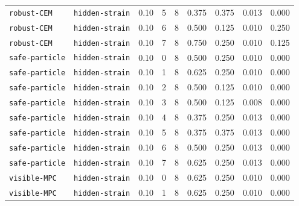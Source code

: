 \documentclass{article}
\begin{document}
\begin{center}
\begin{tabular}{llccccccc}
\texttt{robust-CEM} & \texttt{hidden-strain} & 0.10 & 5 & 8 & 0.375 & 0.375 & 0.013 & 0.000 \\
\texttt{robust-CEM} & \texttt{hidden-strain} & 0.10 & 6 & 8 & 0.500 & 0.125 & 0.010 & 0.250 \\
\texttt{robust-CEM} & \texttt{hidden-strain} & 0.10 & 7 & 8 & 0.750 & 0.250 & 0.010 & 0.125 \\
\texttt{safe-particle} & \texttt{hidden-strain} & 0.10 & 0 & 8 & 0.500 & 0.250 & 0.010 & 0.000 \\
\texttt{safe-particle} & \texttt{hidden-strain} & 0.10 & 1 & 8 & 0.625 & 0.250 & 0.010 & 0.000 \\
\texttt{safe-particle} & \texttt{hidden-strain} & 0.10 & 2 & 8 & 0.500 & 0.125 & 0.010 & 0.000 \\
\texttt{safe-particle} & \texttt{hidden-strain} & 0.10 & 3 & 8 & 0.500 & 0.125 & 0.008 & 0.000 \\
\texttt{safe-particle} & \texttt{hidden-strain} & 0.10 & 4 & 8 & 0.375 & 0.250 & 0.013 & 0.000 \\
\texttt{safe-particle} & \texttt{hidden-strain} & 0.10 & 5 & 8 & 0.375 & 0.375 & 0.013 & 0.000 \\
\texttt{safe-particle} & \texttt{hidden-strain} & 0.10 & 6 & 8 & 0.500 & 0.250 & 0.013 & 0.000 \\
\texttt{safe-particle} & \texttt{hidden-strain} & 0.10 & 7 & 8 & 0.625 & 0.250 & 0.013 & 0.000 \\
\texttt{visible-MPC} & \texttt{hidden-strain} & 0.10 & 0 & 8 & 0.625 & 0.250 & 0.010 & 0.000 \\
\texttt{visible-MPC} & \texttt{hidden-strain} & 0.10 & 1 & 8 & 0.625 & 0.250 & 0.010 & 0.000 \\
\bottomrule
\end{tabular}
\end{center}
\end{document}
